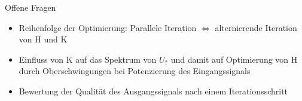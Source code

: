 \begin{frame}{Offene Fragen}

\begin{itemize}
	\item Reihenfolge der Optimierung: Parallele Iteration $ \Leftrightarrow $ alternierende Iteration von H und K
	\item Einfluss von K auf das Spektrum von $U_?$ und damit auf Optimierung von H durch Oberschwingungen bei Potenzierung des Eingangssignals
	\item Bewertung der Qualität des Ausgangssignals nach einem Iterationsschritt
\end{itemize}



\end{frame}



